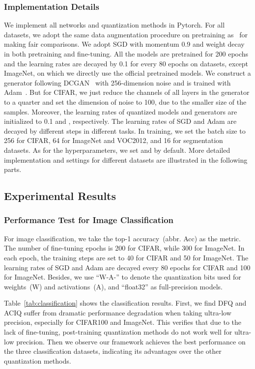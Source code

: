 \documentclass[final]{cvpr}
\begin{document}
\subsubsection{Implementation Details}
We implement all networks and quantization methods in Pytorch. For all datasets, we adopt the same data augmentation procedure on pretraining as~\cite{sandler2018mobilenetv2} for making fair comparisons. We adopt SGD with momentum 0.9 and weight decay  in both pretraining and fine-tuning. All the models are pretrained for 200 epochs and the learning rates are decayed by 0.1 for every 80 epochs on datasets, except ImageNet, on which we directly use the official pretrained models. We construct a generator following DCGAN~\cite{radford2015unsupervised} with 256-dimension noise and is trained with Adam~\cite{kingma2014adam}. But for CIFAR, we just reduce the channels of all layers in the generator to a quarter and set the dimension of noise to 100, due to the smaller size of the samples. Moreover, the learning rates of quantized models and generators are initialized to 0.1 and , respectively. The learning rates of SGD and Adam are decayed by different steps in different tasks. In training, we set the batch size to 256 for CIFAR, 64 for ImageNet and VOC2012, and 16 for segmentation datasets. As for the hyperparameters, we set  and  by default. More detailed implementation and settings for different datasets are illustrated in the following parts. 


\subsection{Experimental Results}

\subsubsection{Performance Test for Image Classification} For image classification, we take the top-1 accuracy~(abbr. Acc) as the metric. 
The number of fine-tuning epochs is 200 for CIFAR, while 300 for ImageNet.
In each epoch, the training steps are set to 40 for CIFAR and 50 for ImageNet. 
The learning rates of SGD and Adam are decayed every 80 epochs for CIFAR and 100 for ImageNet.
Besides, we use ``W-A-'' to denote the quantization bits used for weights~(W) and activations~(A), and ``float32'' as full-precision models.

Table~\ref{tab:classification} shows the classification results.
First, we find DFQ and ACIQ suffer from dramatic performance degradation when taking ultra-low precision, especially for CIFAR100 and ImageNet.
This verifies that due to the lack of fine-tuning, post-training quantization methods do not work well for ultra-low precision.
Then we observe our framework achieves the best performance on the three classification datasets, indicating its advantages over the other quantization methods.
\end{document}
